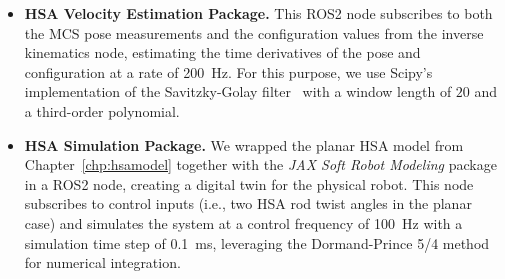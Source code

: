 \begin{itemize}
    \item \textbf{HSA Velocity Estimation Package.} This ROS2 node subscribes to both the \gls{MCS} pose measurements and the configuration values from the inverse kinematics node, estimating the time derivatives of the pose and configuration at a rate of \SI{200}{Hz}. For this purpose, we use Scipy’s~\citep{virtanen202scipy} implementation of the Savitzky-Golay filter~\citep{savitzky1964smoothing} with a window length of $20$ and a third-order polynomial.
    \item \textbf{HSA Simulation Package.} We wrapped the planar \gls{HSA} model from Chapter~\ref{chp:hsamodel} together with the \emph{JAX Soft Robot Modeling} package in a ROS2 node, creating a digital twin for the physical robot. This node subscribes to control inputs (i.e., two \gls{HSA} rod twist angles in the planar case) and simulates the system at a control frequency of \SI{100}{Hz} with a simulation time step of \SI{0.1}{ms}, leveraging the Dormand-Prince 5/4 method~\citep{dormand1980family, shampine1986some} for numerical integration.

\end{itemize}
